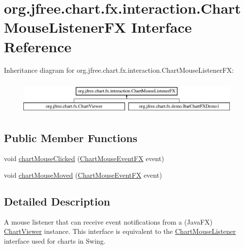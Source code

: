 \hypertarget{interfaceorg_1_1jfree_1_1chart_1_1fx_1_1interaction_1_1_chart_mouse_listener_f_x}{}\section{org.\+jfree.\+chart.\+fx.\+interaction.\+Chart\+Mouse\+Listener\+FX Interface Reference}
\label{interfaceorg_1_1jfree_1_1chart_1_1fx_1_1interaction_1_1_chart_mouse_listener_f_x}
Inheritance diagram for org.\+jfree.\+chart.\+fx.\+interaction.\+Chart\+Mouse\+Listener\+FX\+:\begin{figure}[H]
\begin{center}
\leavevmode
\includegraphics[height=1.783440cm]{interfaceorg_1_1jfree_1_1chart_1_1fx_1_1interaction_1_1_chart_mouse_listener_f_x}
\end{center}
\end{figure}
\subsection*{Public Member Functions}
\begin{DoxyCompactItemize}
\item 
void \mbox{\hyperlink{interfaceorg_1_1jfree_1_1chart_1_1fx_1_1interaction_1_1_chart_mouse_listener_f_x_a7953c88563d5cd432d8232f3ade82403}{chart\+Mouse\+Clicked}} (\mbox{\hyperlink{classorg_1_1jfree_1_1chart_1_1fx_1_1interaction_1_1_chart_mouse_event_f_x}{Chart\+Mouse\+Event\+FX}} event)
\item 
void \mbox{\hyperlink{interfaceorg_1_1jfree_1_1chart_1_1fx_1_1interaction_1_1_chart_mouse_listener_f_x_aaf568a1fc8349de289cc6dbc39a277c2}{chart\+Mouse\+Moved}} (\mbox{\hyperlink{classorg_1_1jfree_1_1chart_1_1fx_1_1interaction_1_1_chart_mouse_event_f_x}{Chart\+Mouse\+Event\+FX}} event)
\end{DoxyCompactItemize}


\subsection{Detailed Description}
A mouse listener that can receive event notifications from a (Java\+FX) \mbox{\hyperlink{classorg_1_1jfree_1_1chart_1_1fx_1_1_chart_viewer}{Chart\+Viewer}} instance. This interface is equivalent to the \mbox{\hyperlink{interfaceorg_1_1jfree_1_1chart_1_1_chart_mouse_listener}{Chart\+Mouse\+Listener}} interface used for charts in Swing.

